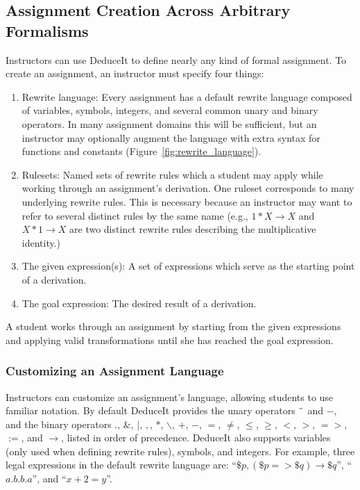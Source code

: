 \documentclass{sigchi}
\newcommand{\msb}[1]{\textbf{\textcolor{cyan}{Michael: #1}}}
\begin{document}
\subsection{Assignment Creation Across Arbitrary Formalisms}

Instructors can use DeduceIt to define nearly any kind of formal assignment. To create an assignment, an instructor must specify four things: 
  \begin{enumerate}
  \item Rewrite language: Every assignment has a default rewrite language composed of variables, symbols, integers, and several common unary and binary operators. In many assignment domains this will be sufficient, but an instructor may optionally augment the language with extra syntax for functions and constants (Figure~\ref{fig:rewrite_language}). 
  \item Rulesets: Named sets of rewrite rules which a student may apply while working through an assignment's derivation. One ruleset corresponds to many underlying rewrite rules. This is necessary because an instructor may want to refer to several distinct rules by the same name (e.g., $1*X \rightarrow X$ and $X*1 \rightarrow X$ are two distinct rewrite rules describing the multiplicative identity.)
  \item The given expression(s): A set of expressions which serve as the starting point of a derivation.
  \item The goal expression: The desired result of a derivation.
  \end{enumerate}

A student works through an assignment by starting from the given expressions and applying valid transformations until she has reached the goal expression. %

\subsubsection{Customizing an Assignment Language}

Instructors can customize an assignment's language, allowing students to use familiar notation. By default DeduceIt provides the unary operators $\char`\~$ and $-$, and the binary operators $.$, $\&$, $|$, $,$, $*$, $\backslash$, $+$, $-$, $=$, $\neq$, $\leq$, $\geq$, $<$, $>$, $=>$, $:=$, and $\rightarrow$, listed in order of precedence. DeduceIt also supports variables (only used when defining rewrite rules), symbols, and integers. For example, three legal expressions in the default rewrite language are: ``$\$p,(\$p=>\$q)\rightarrow{}\$q$'', ``$a.b.b.a$'', and ``$x+2=y$''.
\end{document}
